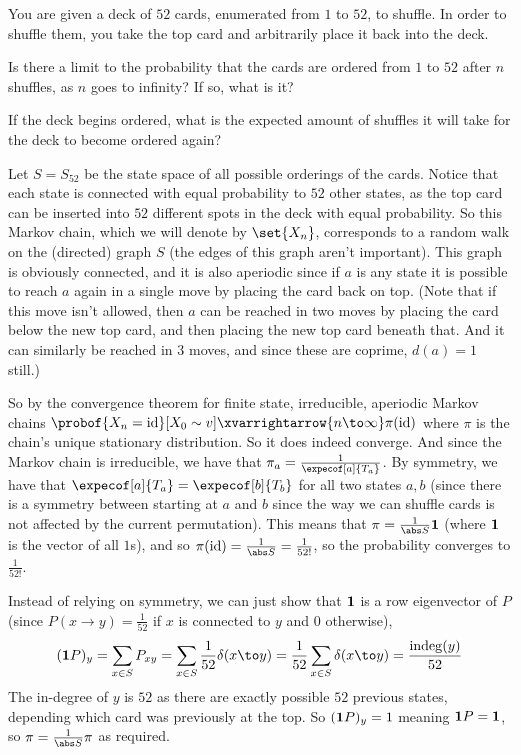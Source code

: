 \bexerc

    You are given a deck of $52$ cards, enumerated from $1$ to $52$, to shuffle.
    In order to shuffle them, you take the top card and arbitrarily place it back into the deck.
    \benum
        \item Is there a limit to the probability that the cards are ordered from $1$ to $52$ after $n$ shuffles, as $n$ goes to infinity?
        If so, what is it?
        \item If the deck begins ordered, what is the expected amount of shuffles it will take for the deck to become ordered again?
    \eenum

\eexerc

\benum
    \item Let $S=S_{52}$ be the state space of all possible orderings of the cards.
    Notice that each state is connected with equal probability to $52$ other states, as the top card can be inserted into $52$ different spots in the deck with equal probability.
    So this Markov chain, which we will denote by $\set{X_n}$, corresponds to a random walk on the (directed) graph $S$ (the edges of this graph aren't important).
    This graph is obviously connected, and it is also aperiodic since if $a$ is any state it is possible to reach $a$ again in a single move by placing the card back on top.
    (Note that if this move isn't allowed, then $a$ can be reached in two moves by placing the card below the new top card, and then placing the new top card beneath that.
    And it can similarly be reached in $3$ moves, and since these are coprime, $d(a)=1$ still.)

    So by the convergence theorem for finite state, irreducible, aperiodic Markov chains $\probof{X_n={\rm id}}[X_0\sim v]\xvarrightarrow{n\to\infty}\pi({\rm id})$ where $\pi$ is the chain's unique
    stationary distribution.
    So it does indeed converge.
    And since the Markov chain is irreducible, we have that $\pi_a=\frac1{\expecof[a]{T_a}}$.
    By symmetry, we have that $\expecof[a]{T_a}=\expecof[b]{T_b}$ for all two states $a,b$ (since there is a symmetry between starting at $a$ and $b$ since the way we can shuffle cards is not affected by
    the current permutation).
    This means that $\pi=\frac1{\abs S}{\bf1}$ (where ${\bf1}$ is the vector of all $1$s), and so $\pi({\rm id})=\frac1{\abs S}=\frac1{52!}$, so the probability converges to $\frac1{52!}$.

    Instead of relying on symmetry, we can just show that ${\bf1}$ is a row eigenvector of $P$ (since $P(x\to y)=\frac1{52}$ if $x$ is connected to $y$ and $0$ otherwise),
    $$ ({\bf1}P)_y = \sum_{x\in S}P_{xy} = \sum_{x\in S}\frac1{52}\delta(x\to y) = \frac1{52}\sum_{x\in S}\delta(x\to y) = \frac{{\rm indeg}(y)}{52} $$
    The in-degree of $y$ is $52$ as there are exactly possible $52$ previous states, depending which card was previously at the top.
    So $({\bf1}P)_y=1$ meaning ${\bf1}P={\bf1}$, so $\pi=\frac1{\abs S}\pi$ as required.

